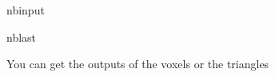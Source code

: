 \documentclass[letterpaper,10pt,english]{sphinxmanual}
\begin{document}
\begin{sphinxuseclass}{nbinput}
\begin{sphinxuseclass}{nblast}
{
\begin{sphinxVerbatim}[commandchars=\\\{\}]
\llap{\color{nbsphinxin}[12]:\,\hspace{\fboxrule}\hspace{\fboxsep}}
  
  
  
  
\end{sphinxVerbatim}
}

\end{sphinxuseclass}
\end{sphinxuseclass}
\sphinxAtStartPar
You can get the outputs of the voxels or the triangles
\end{document}

